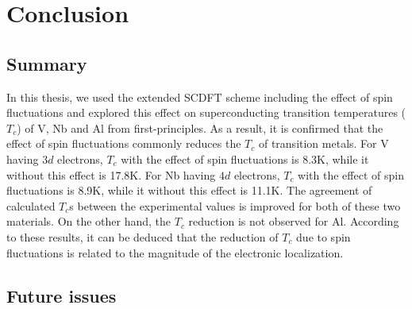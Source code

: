 

%
%
\chapter{Conclusion}

\section{Summary}
In this thesis, we used the extended SCDFT scheme including the effect of spin fluctuations
and explored this effect on superconducting transition temperatures ($T_c$)
of V, Nb and Al from first-principles. 
As a result, it is confirmed that the effect of spin fluctuations commonly
reduces the $T_c$ of transition metals. 
For V having $3d$ electrons, $T_c$ with the effect of spin fluctuations is 8.3K, while it 
without this effect is 17.8K.
For Nb having $4d$ electrons, $T_c$ with the effect of spin fluctuations is 8.9K, while it 
without this effect is 11.1K.
The agreement of calculated $T_c$s between the experimental values is improved for both of these 
two materials. On the other hand, the $T_c$ reduction is not observed for Al.
According to these results, it can be deduced that the reduction of $T_c$ due to spin fluctuations
is related to the magnitude of the electronic localization.

\section{Future issues}

